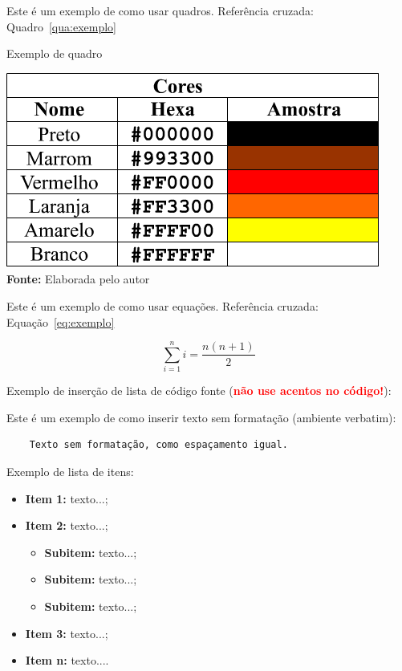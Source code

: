 Este é um exemplo de como usar quadros. Referência cruzada: Quadro~\ref{qua:exemplo}

\FloatBarrier
\begin{quadro}[!htbp]
	\centering
	\caption{Exemplo de quadro}
	\includegraphics[scale=.7]{imagens/exemploQuadro}
	\\\textbf{Fonte:} Elaborada pelo autor
	\label{qua:exemplo}
\end{quadro}
\FloatBarrier


Este é um exemplo de como usar equações. Referência cruzada: Equação~\ref{eq:exemplo}

\begin{equation}
\sum_{i=1}^{n} i = \frac{n(n+1)}{2}
\label{eq:exemplo}
\end{equation}


Exemplo de inserção de lista de código fonte (\textbf{\textcolor{red}{não use acentos no código!}}):

 



Este é um exemplo de como inserir texto sem formatação (ambiente verbatim):

\begin{verbatim}
	Texto sem formatação, como espaçamento igual.
\end{verbatim}


Exemplo de lista de itens:

\begin{itemize}
	\item \textbf{Item 1:} texto...;
	\item \textbf{Item 2:} texto...;
    \begin{itemize}
            \item \textbf{Subitem:} texto...;
            \item \textbf{Subitem:} texto...;
            \item \textbf{Subitem:} texto...;
        \end{itemize}
	\item \textbf{Item 3:} texto...;
	\item \textbf{Item n:} texto....
\end{itemize}


